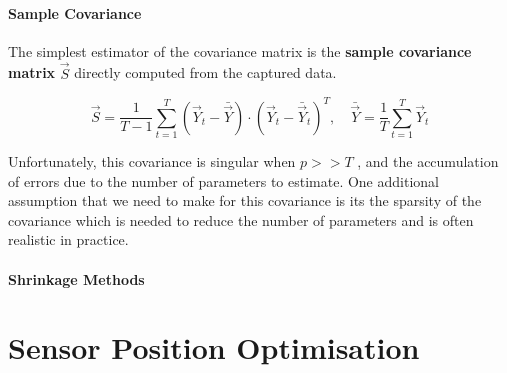 \paragraph{Sample Covariance}

The simplest estimator of the covariance matrix is the \textbf{sample covariance matrix} $\vec{S}$ directly computed from the captured data. 

\begin{equation}
    \vec{S} = \frac{1}{T -1} \sum_{t=1}^T (\vec{Y}_t - \bar{\vec{Y}})\cdot (\vec{Y}_t - \bar{\vec{Y}}_t)^T, \quad \bar{\vec{Y}} = \frac{1}{T} \sum_{t=1}^T \vec{Y}_t
\end{equation}

Unfortunately, this covariance is singular when $p >> T$ \citep{fan_overview_2015}, and the accumulation of errors due to the number of parameters to estimate. One additional assumption that we need to make for this covariance is its the sparsity of the covariance which is needed to reduce the number of parameters and is often realistic in practice. 

\paragraph{Shrinkage Methods}
%
%
%
%
%
%


\section{Sensor Position Optimisation}

